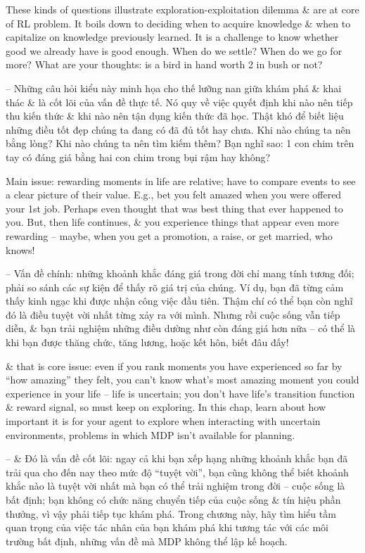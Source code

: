 \documentclass{article}
\begin{document}
\begin{itemize}
    These kinds of questions illustrate exploration-exploitation dilemma \& are at core of RL problem. It boils down to deciding when to acquire knowledge \& when to capitalize on knowledge previously learned. It is a challenge to know whether good we already have is good enough. When do we settle? When do we go for more? What are your thoughts: is a bird in hand worth 2 in bush or not?

    -- Những câu hỏi kiểu này minh họa cho thế lưỡng nan giữa khám phá \& khai thác \& là cốt lõi của vấn đề thực tế. Nó quy về việc quyết định khi nào nên tiếp thu kiến thức \& khi nào nên tận dụng kiến thức đã học. Thật khó để biết liệu những điều tốt đẹp chúng ta đang có đã đủ tốt hay chưa. Khi nào chúng ta nên bằng lòng? Khi nào chúng ta nên tìm kiếm thêm? Bạn nghĩ sao: 1 con chim trên tay có đáng giá bằng hai con chim trong bụi rậm hay không?

    Main issue: rewarding moments in life are relative; have to compare events to see a clear picture of their value. E.g., bet you felt amazed when you were offered your 1st job. Perhaps even thought that was best thing that ever happened to you. But, then life continues, \& you experience things that appear even more rewarding -- maybe, when you get a promotion, a raise, or get married, who knows!

    -- Vấn đề chính: những khoảnh khắc đáng giá trong đời chỉ mang tính tương đối; phải so sánh các sự kiện để thấy rõ giá trị của chúng. Ví dụ, bạn đã từng cảm thấy kinh ngạc khi được nhận công việc đầu tiên. Thậm chí có thể bạn còn nghĩ đó là điều tuyệt vời nhất từng xảy ra với mình. Nhưng rồi cuộc sống vẫn tiếp diễn, \& bạn trải nghiệm những điều dường như còn đáng giá hơn nữa -- có thể là khi bạn được thăng chức, tăng lương, hoặc kết hôn, biết đâu đấy!

    \& that is core issue: even if you rank moments you have experienced so far by ``how amazing'' they felt, you can't know what's most amazing moment you could experience in your life -- life is uncertain; you don't have life's transition function \& reward signal, so must keep on exploring. In this chap, learn about how important it is for your agent to explore when interacting with uncertain environments, problems in which MDP isn't available for planning.

    -- \& Đó là vấn đề cốt lõi: ngay cả khi bạn xếp hạng những khoảnh khắc bạn đã trải qua cho đến nay theo mức độ ``tuyệt vời'', bạn cũng không thể biết khoảnh khắc nào là tuyệt vời nhất mà bạn có thể trải nghiệm trong đời -- cuộc sống là bất định; bạn không có chức năng chuyển tiếp của cuộc sống \& tín hiệu phần thưởng, vì vậy phải tiếp tục khám phá. Trong chương này, hãy tìm hiểu tầm quan trọng của việc tác nhân của bạn khám phá khi tương tác với các môi trường bất định, những vấn đề mà MDP không thể lập kế hoạch.


\end{itemize}
\end{document}
